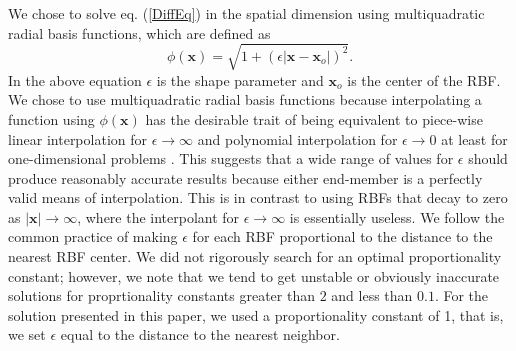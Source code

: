 \documentclass[12pt]{article}
\begin{document}
We chose to solve eq. (\ref{DiffEq}) in the spatial dimension using
multiquadratic radial basis functions, which are defined as
\begin{equation}\label{RBF}
  \phi(\boldsymbol{x}) = \sqrt{1 + (\epsilon|\boldsymbol{x} - \boldsymbol{x}_o|)^2}. 
\end{equation}
In the above equation $\epsilon$ is the shape parameter and
$\boldsymbol{x}_o$ is the center of the RBF.  We chose to use
multiquadratic radial basis functions because interpolating a function
using $\phi(\boldsymbol{x})$ has the desirable trait of being
equivalent to piece-wise linear interpolation for $\epsilon \to
\infty$ and polynomial interpolation for $\epsilon \to 0$ at least for
one-dimensional problems \citep{D2002}.  This suggests that a wide
range of values for $\epsilon$ should produce reasonably accurate
results because either end-member is a perfectly valid means of
interpolation.  This is in contrast to using RBFs that decay to zero
as $|\boldsymbol{x}| \to \infty$, where the interpolant for $\epsilon
\to \infty$ is essentially useless.  We follow the common practice of
making $\epsilon$ for each RBF proportional to the distance to the
nearest RBF center.  We did not rigorously search for an optimal
proportionality constant; however, we note that we tend to get
unstable or obviously inaccurate solutions for proprtionality
constants greater than $2$ and less than $0.1$.  For the solution
presented in this paper, we used a proportionality constant of 1, that
is, we set $\epsilon$ equal to the distance to the nearest neighbor.
\end{document}
